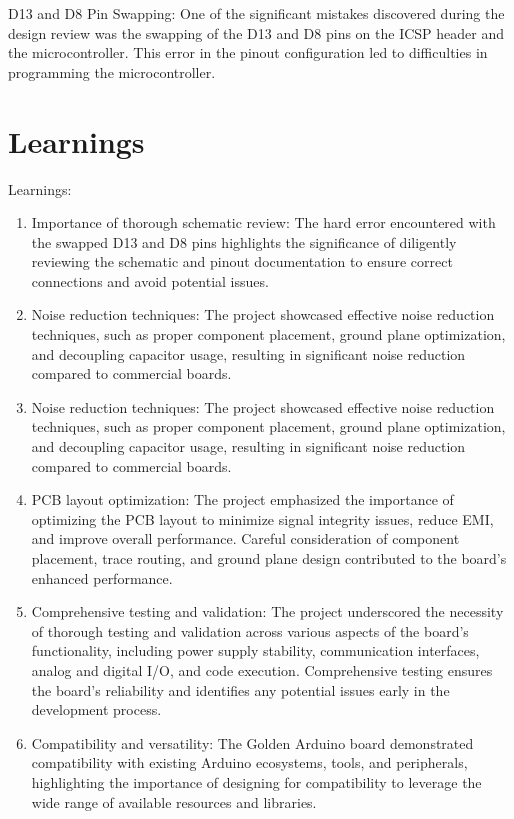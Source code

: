 \documentclass[a4paper,11pt]{article}%
\begin{document}
D13 and D8 Pin Swapping: One of the significant mistakes discovered during the design review was the swapping of the D13 and D8 pins on the ICSP header and the microcontroller. This error in the pinout configuration led to difficulties in programming the microcontroller.

\section{Learnings}




Learnings:
\begin{enumerate}
	\item Importance of thorough schematic review: The hard error encountered with the swapped D13 and D8 pins highlights the significance of diligently reviewing the schematic and pinout documentation to ensure correct connections and avoid potential issues.
	\item Noise reduction techniques: The project showcased effective noise reduction techniques, such as proper component placement, ground plane optimization, and decoupling capacitor usage, resulting in significant noise reduction compared to commercial boards.
	\item Noise reduction techniques: The project showcased effective noise reduction techniques, such as proper component placement, ground plane optimization, and decoupling capacitor usage, resulting in significant noise reduction compared to commercial boards.
	\item
	      PCB layout optimization: The project emphasized the importance of optimizing the PCB layout to minimize signal integrity issues, reduce EMI, and improve overall performance. Careful consideration of component placement, trace routing, and ground plane design contributed to the board's enhanced performance.
	\item Comprehensive testing and validation: The project underscored the necessity of thorough testing and validation across various aspects of the board's functionality, including power supply stability, communication interfaces, analog and digital I/O, and code execution. Comprehensive testing ensures the board's reliability and identifies any potential issues early in the development process.
	\item Compatibility and versatility: The Golden Arduino board demonstrated compatibility with existing Arduino ecosystems, tools, and peripherals, highlighting the importance of designing for compatibility to leverage the wide range of available resources and libraries.

\end{enumerate}
\end{document}
